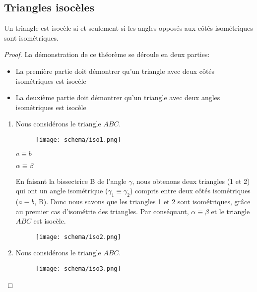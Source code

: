 \documentclass[a4paper,12pt]{article}
\begin{document}
\pagebreak
\subsection{Triangles isocèles}
\begin{theorem}
Un triangle est isocèle si et seulement si les angles opposés aux côtés isométriques sont isométriques.
\end{theorem}

\begin{proof}
La démonstration de ce théorème se déroule en deux parties:
\begin{itemize}
    \item La première partie doit démontrer qu'un triangle avec deux côtés isométriques est isocèle
    \item La deuxième partie doit démontrer qu'un triangle avec deux angles isométriques est isocèle
    \end{itemize}

    \begin{enumerate}
        \item Nous considérons le triangle $ABC$.
        \begin{figure}[H]
        \centering
        \texttt{[image: schema/iso1.png]}
    \end{figure}
    
    
    \begin{hyp}
    $a\equiv b$
    \end{hyp}
    \begin{concl}
    $\alpha \equiv \beta$
    \end{concl}
    En faisant la bissectrice B de l'angle $\gamma$, nous obtenons deux triangles (1 et 2) qui ont un angle isométrique ($\gamma_1 \equiv \gamma_2$) compris entre deux côtés isométriques ($a\equiv b$, B). Donc nous savons que les triangles 1 et 2 sont isométriques, grâce au premier cas d'isométrie des triangles. Par conséquant, $\alpha \equiv \beta$ et le triangle $ABC$ est isocèle.
    
    
    \begin{figure}[H]
        \centering
        \texttt{[image: schema/iso2.png]}
    \end{figure}
    
    
    
    
    \item Nous considérons le triangle $ABC$.
    \begin{figure}[H]
            \centering
            \texttt{[image: schema/iso3.png]}
    \end{figure}


\end{enumerate}
\end{proof}
\end{document}
